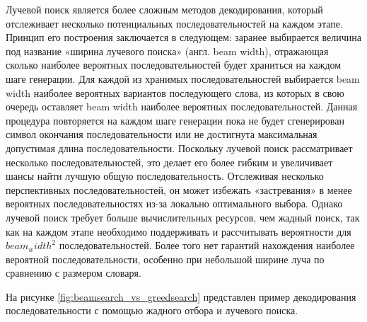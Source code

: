\documentclass[a4paper,12pt]{extarticle}
\begin{document}
Лучевой поиск является более сложным методов декодирования, который отслеживает несколько потенциальных последовательностей на каждом этапе. Принцип его построения заключается в следующем: заранее выбирается величина под название «ширина лучевого поиска» (англ. beam width), отражающая сколько наиболее вероятных последовательностей будет храниться на каждом шаге генерации. Для каждой из хранимых последовательностей выбирается beam width наиболее вероятных вариантов последующего слова, из которых в свою очередь оставляет beam width наиболее вероятных последовательностей. Данная процедура повторяется на каждом шаге генерации пока не будет сгенерирован символ окончания последовательности или не достигнута максимальная допустимая длина последовательности. Поскольку лучевой поиск рассматривает несколько последовательностей, это делает его более гибким и увеличивает шансы найти лучшую общую последовательность. Отслеживая несколько перспективных последовательностей, он может избежать «застревания» в менее вероятных последовательностях из-за локально оптимального выбора. Однако лучевой поиск требует больше вычислительных ресурсов, чем жадный поиск, так как на каждом этапе необходимо поддерживать и рассчитывать вероятности для $beam_width^2$ последовательностей. Более того нет гарантий нахождения наиболее вероятной последовательности, особенно при небольшой ширине луча по сравнению с размером словаря.

На рисунке \ref{fig:beamsearch_vs_greedsearch} представлен пример декодирования последовательности с помощью жадного отбора и лучевого поиска.
\end{document}
